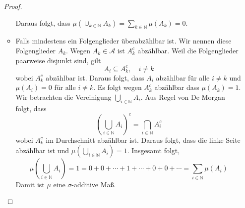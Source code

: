\documentclass[draft,a5paper]{article}
\theoremstyle{remark}
\begin{document}
\begin{enumerate}
\begin{proof}
\begin{itemize}
      Daraus folgt, dass \(\mu(\cup_{k \in \mathbb{N}}A_{k}) = \sum_{k \in \mathbb{N}}\mu(A_{k}) = 0\).

    \item Falls mindestens ein Folgenglieder überabzählbar ist.  Wir
      nennen diese Folgenglieder \(A_{k}\).  Wegen
      \(A_{k} \in \mathcal{A}\) ist \(A_{k}^{c}\) abzählbar.  Weil die Folgenglieder
      paarweise disjunkt sind, gilt
      \[A_{i} \subseteq A_{k}^{c}, \quad i \ne k\] wobei \(A_{k}^{c}\) abzählbar ist.
      Daraus folgt, dass \(A_{i}\) abzählbar für alle \(i \ne k\) und
      \(\mu(A_{i}) = 0\) für alle \(i \ne k\).  Es folgt wegen
      \(A_{k}^{c}\) abzählbar dass \(\mu(A_{k}) = 1\).  Wir betrachten die
      Vereinigung \(\bigcup_{i \in \mathbb{N}}{A_{i}}\).  Aus Regel von De Morgan folgt,
      dass
      \[\left(\bigcup_{i \in \mathbb{N}}A_{i}\right)^{c} = \bigcap_{i \in \mathbb{N}}A_{i}^{c}\]
      wobei \(A_{k}^{c}\) im Durchschnitt abzählbar ist.  Daraus folgt,
      dass die linke Seite abzählbar ist und
      \(\mu\left(\bigcup_{i \in \mathbb{N}}A_{i}\right) = 1\).  Insgesamt folgt,
      \[ \mu{\left(\bigcup_{i \in \mathbb{N}}{A_{i}}\right)} = 1 = 0 + 0 + \cdots + 1 + \cdots + 0
        + 0 + \cdots = \sum_{i \in \mathbb{N}}{\mu(A_{i})}\] Damit ist
      \(\mu\) eine \(\sigma\)-additive Maß.
    \end{itemize}
  \end{proof}
\end{enumerate}
\newpage
\end{document}

